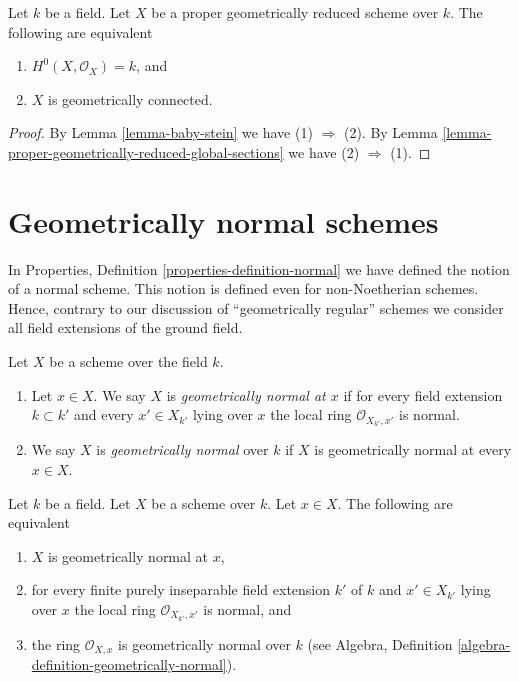 \begin{lemma}
\label{lemma-geometrically-reduced-stein}
Let $k$ be a field. Let $X$ be a proper geometrically reduced scheme over $k$.
The following are equivalent
\begin{enumerate}
\item $H^0(X, \mathcal{O}_X) = k$, and
\item $X$ is geometrically connected.
\end{enumerate}
\end{lemma}

\begin{proof}
By Lemma \ref{lemma-baby-stein} we have (1) $\Rightarrow$ (2).
By Lemma \ref{lemma-proper-geometrically-reduced-global-sections}
we have (2) $\Rightarrow$ (1).
\end{proof}




\section{Geometrically normal schemes}
\label{section-geometrically-normal}

\noindent
In Properties, Definition \ref{properties-definition-normal}
we have defined the notion of a normal scheme.
This notion is defined even for non-Noetherian
schemes. Hence, contrary to our discussion of
``geometrically regular'' schemes we consider all
field extensions of the ground field.

\begin{definition}
\label{definition-geometrically-normal}
Let $X$ be a scheme over the field $k$.
\begin{enumerate}
\item Let $x \in X$. We say $X$ is
{\it geometrically normal at $x$} if for every
field extension $k \subset k'$ and every $x' \in X_{k'}$ lying over $x$
the local ring $\mathcal{O}_{X_{k'}, x'}$ is normal.
\item We say $X$ is {\it geometrically normal} over $k$ if $X$
is geometrically normal at every $x \in X$.
\end{enumerate}
\end{definition}

\begin{lemma}
\label{lemma-geometrically-normal-at-point}
Let $k$ be a field.
Let $X$ be a scheme over $k$.
Let $x \in X$.
The following are equivalent
\begin{enumerate}
\item $X$ is geometrically normal at $x$,
\item for every finite purely inseparable field extension $k'$ of $k$
and $x' \in X_{k'}$ lying over $x$ the local ring
$\mathcal{O}_{X_{k'}, x'}$ is normal, and
\item the ring $\mathcal{O}_{X, x}$ is geometrically
normal over $k$ (see
Algebra, Definition \ref{algebra-definition-geometrically-normal}).
\end{enumerate}
\end{lemma}

